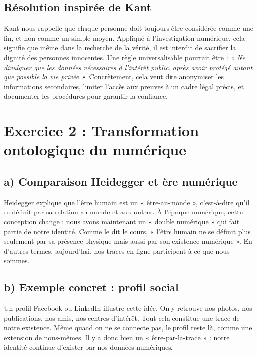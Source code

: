 \documentclass[12pt,a4paper]{report}
\begin{document}
	\subsection*{Résolution inspirée de Kant}
	
	Kant nous rappelle que chaque personne doit toujours être considérée comme une fin, et non 
	comme un simple moyen. Appliqué à l’investigation numérique, cela signifie que même dans 
	la recherche de la vérité, il est interdit de sacrifier la dignité des personnes innocentes.  
	Une règle universalisable pourrait être : \textit{« Ne divulguer que les données nécessaires à 
		l’intérêt public, après avoir protégé autant que possible la vie privée »}.  
	Concrètement, cela veut dire anonymiser les informations secondaires, limiter l’accès aux 
	preuves à un cadre légal précis, et documenter les procédures pour garantir la confiance.  
	
	\section*{Exercice 2 : Transformation ontologique du numérique}
	
	\subsection*{a) Comparaison Heidegger et ère numérique}
	
	Heidegger explique que l’être humain est un « être-au-monde », 
	c’est-à-dire qu’il se définit par sa relation au monde et aux autres.  
	À l’époque numérique, cette conception change : 
	nous avons maintenant un « double numérique » qui fait partie de notre identité.  
	Comme le dit le cours, « l’être humain ne se définit plus seulement par sa présence physique 
	mais aussi par son existence numérique ».  
	En d’autres termes, aujourd’hui, nos traces en ligne participent à ce que nous sommes.  
	
	\subsection*{b) Exemple concret : profil social}
	
	Un profil Facebook ou LinkedIn illustre cette idée.  
	On y retrouve nos photos, nos publications, nos amis, nos centres d’intérêt.  
	Tout cela constitue une trace de notre existence.  
	Même quand on ne se connecte pas, le profil reste là, comme une extension de nous-mêmes.  
	Il y a donc bien un « être-par-la-trace » : notre identité continue d’exister par nos données numériques.  
	
\end{document}
